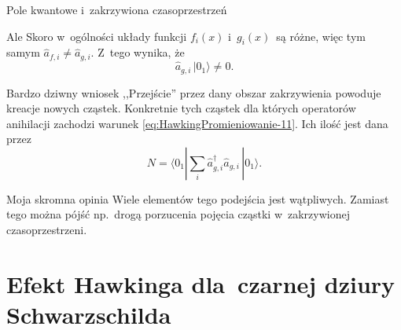 \documentclass{beamer}  %
\begin{document}
\begin{frame}{Pole kwantowe i~zakrzywiona czasoprzestrzeń}

  \begin{block}{Ale}
    Skoro w~ogólności układy funkcji $f_{ i }( x )$
    i~$g_{ i }( x )$~są różne, więc tym samym
    $\widehat{ a }_{ f, i } \neq \widehat{ a }_{ g, i }$. Z~tego
    wynika, że
    \begin{equation}
      \label{eq:HawkingPromieniowanie-11}
      \widehat{ a }_{ g, i }\, | 0_{ 1 } \rangle \neq 0.
    \end{equation}
  \end{block}

  \begin{block}{Bardzo dziwny wniosek}
    ,,Przejście'' przez dany obszar zakrzywienia powoduje kreacje
    nowych cząstek. Konkretnie tych cząstek dla których operatorów
    anihilacji zachodzi warunek \eqref{eq:HawkingPromieniowanie-11}. Ich ilość jest dana
    przez
    \begin{equation}
      \label{eq:HawkingPromieniowanie-12}
      N
      = \langle 0_{ 1 } | \sum_{ i } \widehat{ a }_{ g, i }^{ \dagger }
      \widehat{ a }_{ g, i }\, | 0_{ 1 } \rangle.
    \end{equation}
  \end{block}

  \begin{block}{Moja skromna opinia}
    Wiele elementów tego podejścia jest wątpliwych. Zamiast tego można
    pójść np.~drogą porzucenia pojęcia cząstki w~zakrzywionej
    czasoprzestrzeni.
  \end{block}

\end{frame}





\section[Przypadek czarnej dziury Schwarzschilda]{Efekt Hawkinga
  dla~czarnej dziury Schwarzschilda}
\end{document}
